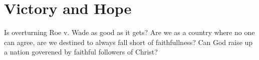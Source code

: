 \chapter{Victory and Hope}

Is overturning Roe v. Wade as good as it gets?
Are we as a country where no one can agree, are we destined to always fall short of faithfullness?
Can God raise up a nation goverened by faithful followers of Christ?
